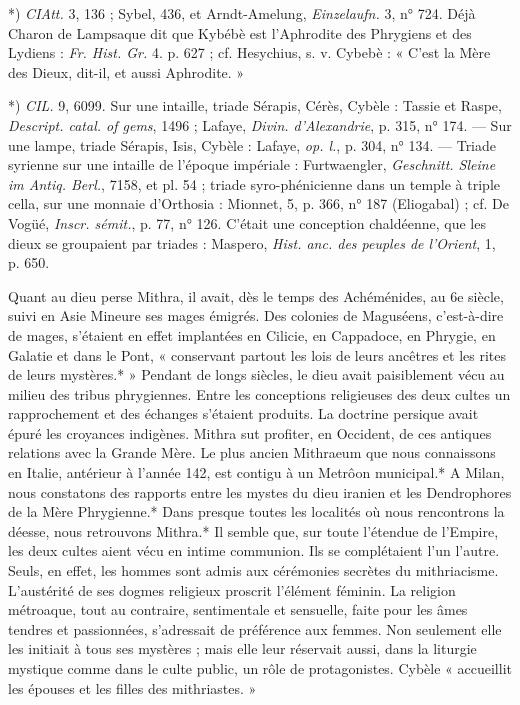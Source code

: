 \documentclass[a4paper, 11pt, oneside, polutonikogreek, french]{article}
\begin{document}
*) \emph{CIAtt.} 3, 136 ; Sybel, 436, et Arndt-Amelung, \emph{Einzelaufn.} 3, n° 724. Déjà Charon de Lampsaque dit que Kybébè est l'Aphrodite des Phrygiens et des Lydiens : \emph{Fr. Hist. Gr.} 4. p. 627 ; cf. Hesychius, s. v. Cybebè : « C'est la Mère des Dieux, dit-il, et aussi Aphrodite. »

*) \emph{CIL.} 9, 6099. Sur une intaille, triade Sérapis, Cérès, Cybèle : Tassie et Raspe, \emph{Descript. catal. of gems}, 1496 ; Lafaye, \emph{Divin. d'Alexandrie}, p. 315, n° 174. --- Sur une lampe, triade Sérapis, Isis, Cybèle : Lafaye, \emph{op. l.}, p. 304, n° 134. --- Triade syrienne sur une intaille de l'époque impériale : Furtwaengler, \emph{Geschnitt. Sleine im Antiq. Berl.}, 7158, et pl. 54 ; triade syro-phénicienne dans un temple à triple cella, sur une monnaie d'Orthosia : Mionnet, 5, p. 366, n° 187 (Eliogabal) ; cf. De Vogüé, \emph{Inscr. sémit.}, p. 77, n° 126. C'était une conception chaldéenne, que les dieux se groupaient par triades : Maspero, \emph{Hist. anc. des peuples de l'Orient}, 1, p. 650.

Quant au dieu perse Mithra, il avait, dès le temps des Achéménides, au 6e siècle, suivi en Asie Mineure ses mages émigrés. Des colonies de Maguséens, c'est-à-dire de mages, s'étaient en effet implantées en Cilicie, en Cappadoce, en Phrygie, en Galatie et dans le Pont, « conservant partout les lois de leurs ancêtres et les rites de leurs mystères.* » Pendant de longs siècles, le dieu avait paisiblement vécu au milieu des tribus phrygiennes. Entre les conceptions religieuses des deux cultes un rapprochement et des échanges s'étaient produits. La doctrine persique avait épuré les croyances indigènes. Mithra sut profiter, en Occident, de ces antiques relations avec la Grande Mère. Le plus ancien Mithraeum que nous connaissons en Italie, antérieur à l'année 142, est contigu à un Metrôon municipal.* A Milan, nous constatons des rapports entre les mystes du dieu iranien et les Dendrophores de la Mère Phrygienne.* Dans presque toutes les localités où nous rencontrons la déesse, nous retrouvons Mithra.* Il semble que, sur toute l'étendue de l'Empire, les deux cultes aient vécu en intime communion. Ils se complétaient l'un l'autre. Seuls, en effet, les hommes sont admis aux cérémonies secrètes du mithriacisme. L'austérité de ses dogmes religieux proscrit l'élément féminin. La religion métroaque, tout au contraire, sentimentale et sensuelle, faite pour les âmes tendres et passionnées, s'adressait de préférence aux femmes. Non seulement elle les initiait à tous ses mystères ; mais elle leur réservait aussi, dans la liturgie mystique comme dans le culte public, un rôle de protagonistes. Cybèle « accueillit les épouses et les filles des mithriastes. »
\end{document}
